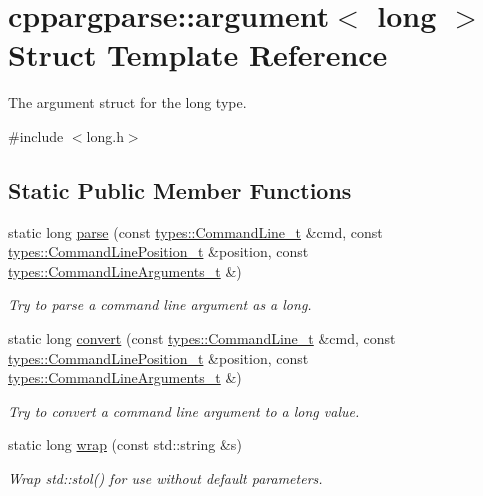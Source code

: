 \hypertarget{structcppargparse_1_1argument_3_01long_01_4}{}\section{cppargparse\+:\+:argument$<$ long $>$ Struct Template Reference}
\label{structcppargparse_1_1argument_3_01long_01_4}


The argument struct for the long type.  




{\ttfamily \#include $<$long.\+h$>$}

\subsection*{Static Public Member Functions}
\begin{DoxyCompactItemize}
\item 
static long \hyperlink{structcppargparse_1_1argument_3_01long_01_4_a505f7e1215f1b2939f05dfb451b7a90a}{parse} (const \hyperlink{types_8h_a80adf2418b7ce9fe616698efa7533ecf}{types\+::\+Command\+Line\+\_\+t} \&cmd, const \hyperlink{types_8h_a43b4f43f8940de1bf09ced6f1b668053}{types\+::\+Command\+Line\+Position\+\_\+t} \&position, const \hyperlink{types_8h_a003c660afe2ee9c6cc39aea966e8926d}{types\+::\+Command\+Line\+Arguments\+\_\+t} \&)
\begin{DoxyCompactList}\small\item\em Try to parse a command line argument as a long. \end{DoxyCompactList}\item 
static long \hyperlink{structcppargparse_1_1argument_3_01long_01_4_a8fe695168f4152ec996e929fb76330c1}{convert} (const \hyperlink{types_8h_a80adf2418b7ce9fe616698efa7533ecf}{types\+::\+Command\+Line\+\_\+t} \&cmd, const \hyperlink{types_8h_a43b4f43f8940de1bf09ced6f1b668053}{types\+::\+Command\+Line\+Position\+\_\+t} \&position, const \hyperlink{types_8h_a003c660afe2ee9c6cc39aea966e8926d}{types\+::\+Command\+Line\+Arguments\+\_\+t} \&)
\begin{DoxyCompactList}\small\item\em Try to convert a command line argument to a long value. \end{DoxyCompactList}\item 
static long \hyperlink{structcppargparse_1_1argument_3_01long_01_4_ac33c0aa6353edf86d2a64fbad2724cd6}{wrap} (const std\+::string \&s)
\begin{DoxyCompactList}\small\item\em Wrap std\+::stol() for use without default parameters. \end{DoxyCompactList}\end{DoxyCompactItemize}



